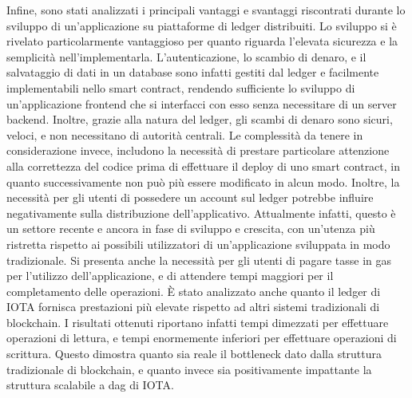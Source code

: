 \documentclass[12pt,a4paper,openright,twoside]{report}
\begin{document}
Infine, sono stati analizzati i principali vantaggi e svantaggi riscontrati durante lo sviluppo di un'applicazione su piattaforme di ledger distribuiti. Lo sviluppo si è rivelato particolarmente vantaggioso per quanto riguarda l'elevata sicurezza e la semplicità nell'implementarla. L'autenticazione, lo scambio di denaro, e il salvataggio di dati in un database sono infatti gestiti dal ledger e facilmente implementabili nello smart contract, rendendo sufficiente lo sviluppo di un'applicazione frontend che si interfacci con esso senza necessitare di un server backend. Inoltre, grazie alla natura del ledger, gli scambi di denaro sono sicuri, veloci, e non necessitano di autorità centrali. Le complessità da tenere in considerazione invece, includono la necessità di prestare particolare attenzione alla correttezza del codice prima di effettuare il deploy di uno smart contract, in quanto successivamente non può più essere modificato in alcun modo. Inoltre, la necessità per gli utenti di possedere un account sul ledger potrebbe influire negativamente sulla distribuzione dell'applicativo. Attualmente infatti, questo è un settore recente e ancora in fase di sviluppo e crescita, con un'utenza più ristretta rispetto ai possibili utilizzatori di un'applicazione sviluppata in modo tradizionale. Si presenta anche la necessità per gli utenti di pagare tasse in gas per l'utilizzo dell'applicazione, e di attendere tempi maggiori per il completamento delle operazioni. È stato analizzato anche quanto il ledger di IOTA fornisca prestazioni più elevate rispetto ad altri sistemi tradizionali di blockchain. I risultati ottenuti riportano infatti tempi dimezzati per effettuare operazioni di lettura, e tempi enormemente inferiori per effettuare operazioni di scrittura. Questo dimostra quanto sia reale il bottleneck dato dalla struttura tradizionale di blockchain, e quanto invece sia positivamente impattante la struttura scalabile a \acrshort{dag} di IOTA.\\
\end{document}

